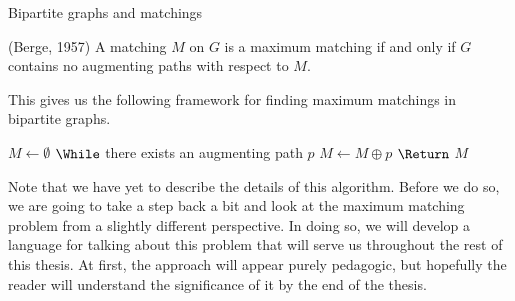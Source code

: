 \begin{section}{Bipartite graphs and matchings}
	\begin{theorem}{(Berge, 1957)}
		A matching $M$ on $G$ is a maximum matching if and only if $G$ contains no augmenting 
		paths with respect to $M$.
	\end{theorem}
	\singlespace
	This gives us the following framework for finding maximum matchings in bipartite graphs.
	\begin{codebox}
		\li $M \gets \emptyset $
		\li $\While$ there exists an augmenting path $p$
			\Do
		\li		$M \gets M\oplus p$
			\End
		\li $\Return$ $M$
	\end{codebox}
	\doublespacing
	Note that we have yet to describe the details of this algorithm. Before we do so, we are going 
	to take a step back a bit and look at the maximum matching problem from a slightly different 
	perspective. In doing so, we will develop a language for talking about this problem that will 
	serve us throughout the rest of this thesis. At first, the approach will appear purely 
	pedagogic, but hopefully the reader will understand the significance of it by the end of the 
	thesis.

\end{section}

